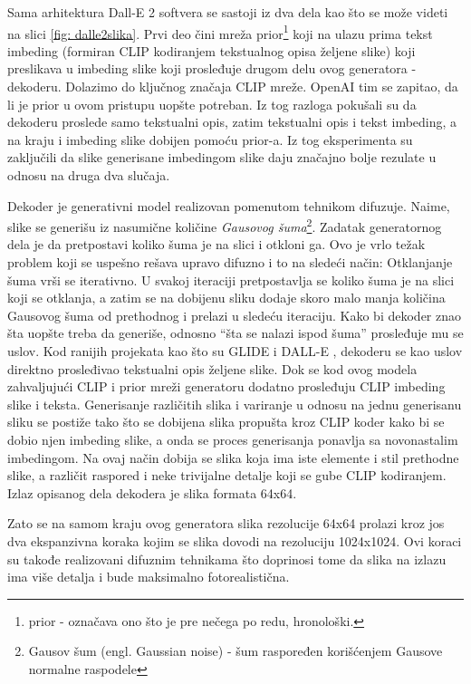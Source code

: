 \documentclass[12pt, letterpaper]{article}
\begin{document}
Sama arhitektura Dall-E 2 softvera se sastoji iz dva dela kao što se može videti na slici \ref{fig: dalle2slika}. Prvi deo čini mreža prior\footnote{prior - označava ono što je pre nečega po redu, hronološki.} koji na ulazu prima tekst imbeding (formiran CLIP kodiranjem tekstualnog opisa željene slike) koji preslikava u imbeding slike koji prosleđuje drugom delu ovog generatora - dekoderu. Dolazimo do ključnog značaja CLIP mreže. OpenAI tim se zapitao, da li je prior u ovom pristupu uopšte potreban. Iz tog razloga pokušali su da dekoderu proslede samo tekstualni opis, zatim tekstualni opis i tekst imbeding, a na kraju i imbeding slike dobijen pomoću prior-a. Iz tog eksperimenta su zaključili da slike generisane imbedingom slike daju značajno bolje rezulate u odnosu na druga dva slučaja.

Dekoder je generativni model realizovan pomenutom tehnikom difuzuje. Naime, slike se generišu iz nasumične količine \textit{Gausovog šuma}\footnote{Gausov šum (engl. Gaussian noise) - šum raspoređen korišćenjem Gausove normalne raspodele}. Zadatak generatornog dela je da pretpostavi koliko šuma je na slici i otkloni ga. Ovo je vrlo težak problem koji se uspešno rešava upravo difuzno i to na sledeći način: Otklanjanje šuma vrši se iterativno. U svakoj iteraciji pretpostavlja se koliko šuma je na slici koji se otklanja, a zatim se na dobijenu sliku dodaje skoro malo manja količina Gausovog šuma od prethodnog i prelazi u sledeću iteraciju. Kako bi dekoder znao šta uopšte treba da generiše, odnosno “šta se nalazi ispod šuma” prosleđuje mu se uslov. Kod ranijih projekata kao što su GLIDE i DALL-E \cite{openai_glide}, dekoderu se kao uslov direktno prosleđivao tekstualni opis željene slike. Dok se kod ovog modela zahvaljujući CLIP i prior mreži generatoru dodatno prosleđuju CLIP imbeding slike i teksta. Generisanje različitih slika i variranje u odnosu na jednu generisanu sliku se postiže tako što se dobijena slika propušta kroz CLIP koder kako bi se dobio njen imbeding slike, a onda se proces generisanja ponavlja sa novonastalim imbedingom. Na ovaj način dobija se slika koja ima iste elemente i stil prethodne slike, a različit raspored i neke trivijalne detalje koji se gube CLIP kodiranjem. Izlaz opisanog dela dekodera je slika formata 64x64\cite{openai_dali}.

Zato se na samom kraju ovog generatora slika rezolucije 64x64 prolazi kroz jos dva ekspanzivna koraka kojim se slika dovodi na rezoluciju 1024x1024. Ovi koraci su takođe realizovani difuznim tehnikama što doprinosi tome da slika na izlazu ima više detalja i bude maksimalno fotorealistična.
\end{document}
